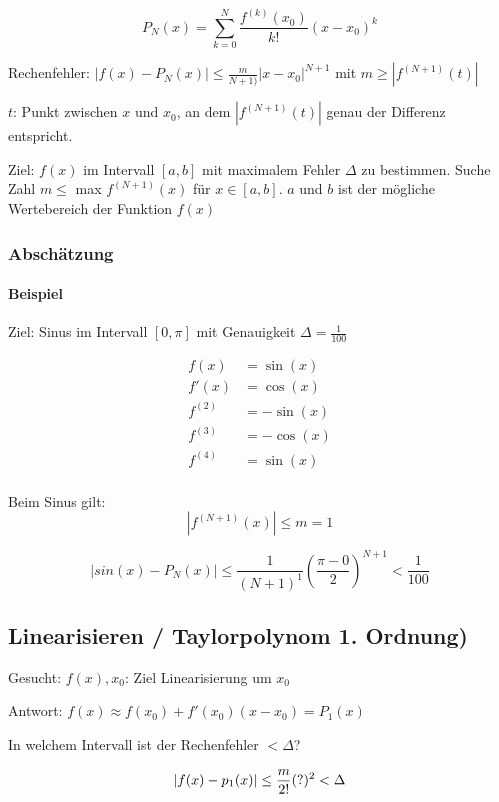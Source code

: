 \[
	P_N(x) = \sum^{N}_{k=0}{\frac{f^{(k)}(x_0)}{k!} (x-x_0)^k}
\]

Rechenfehler: $\left| f(x) - P_N(x) \right| \leq \frac{m}{N+1)} \left| x-x_0 \right|^{N+1}$ mit $m \geq \left| f^{(N+1)}(t) \right|$

$t$: Punkt zwischen $x$ und $x_0$, an dem $\left| f^{(N+1)}(t) \right|$ genau der Differenz entspricht.

Ziel: $f(x)$ im Intervall $[a,b]$ mit maximalem Fehler $\Delta$ zu bestimmen.
Suche Zahl $m \leq$ max $f^{(N+1)}(x)$ für $x \in [a,b]$. $a$ und $b$ ist der mögliche Wertebereich der Funktion $f(x)$

\subsubsection{Abschätzung}



\paragraph{Beispiel}

Ziel: Sinus im Intervall $[0, \pi]$ mit Genauigkeit $\Delta = \frac{1}{100}$

\begin{align*}
	f(x) &= \sin(x) \\
	f'(x) &= \cos(x) \\
	f^{(2)} &= -\sin(x) \\
	f^{(3)} &= -\cos(x) \\
	f^{(4)} &= \sin(x) \\
\end{align*}

Beim Sinus gilt:
\[
	\left| f^{(N+1)}(x) \right| \leq m = 1
\]

\[
	\left| sin(x) - P_N(x) \right| \leq \frac{1}{(N+1)^1} \left(\frac{\pi-0}{2}\right)^{N+1} < \frac{1}{100}
\]

\subsection{Linearisieren / Taylorpolynom 1. Ordnung)}
Gesucht: $f(x), x_0$: Ziel Linearisierung um $x_0$

Antwort: $f(x) \approx f(x_0) + f'(x_0)(x-x_0) = P_1(x)$

In welchem Intervall ist der Rechenfehler $< \Delta$?

\[
	\left|f(x) - p_1(x) \right| \leq \frac{m}{2!}(?)^2 < \Delta \\
\]

